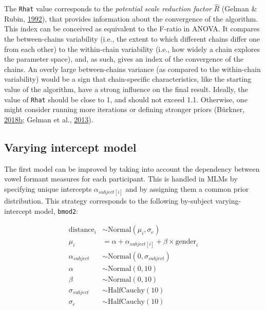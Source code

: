 \documentclass[a4paper,12pt,twoside,onecolumn,openright,final,oldfontcommands]{memoir}
\begin{document}
The \texttt{Rhat} value corresponds to the \emph{potential scale reduction factor} \(\hat{R}\) (Gelman \& Rubin, \protect\hyperlink{ref-gelman_inference_1992}{1992}), that provides information about the convergence of the algorithm. This index can be conceived as equivalent to the F-ratio in ANOVA. It compares the between-chains variability (i.e., the extent to which different chains differ one from each other) to the within-chain variability (i.e., how widely a chain explores the parameter space), and, as such, gives an index of the convergence of the chains. An overly large between-chains variance (as compared to the within-chain variability) would be a sign that chain-specific characteristics, like the starting value of the algorithm, have a strong influence on the final result. Ideally, the value of \texttt{Rhat} should be close to 1, and should not exceed 1.1. Otherwise, one might consider running more iterations or defining stronger priors (Bürkner, \protect\hyperlink{ref-R-brms}{2018}\protect\hyperlink{ref-R-brms}{b}; Gelman et al., \protect\hyperlink{ref-gelman_bayesian_2013}{2013}).

\hypertarget{shrink}{%
\subsection{Varying intercept model}\label{shrink}}

The first model can be improved by taking into account the dependency between vowel formant measures for each participant. This is handled in MLMs by specifying unique intercepts \(\alpha_{subject[i]}\) and by assigning them a common prior distribution. This strategy corresponds to the following by-subject varying-intercept model, \texttt{bmod2}:

\[
\begin{aligned}
\text{distance}_{i} &\sim \mathrm{Normal}(\mu_{i}, \sigma_{e}) \\
\mu_{i} &= \alpha + \alpha_{subject[i]} + \beta \times \text{gender}_{i} \\
\alpha_{subject} &\sim \mathrm{Normal}(0, \sigma_{subject}) \\
\alpha &\sim \mathrm{Normal}(0, 10) \\
\beta &\sim \mathrm{Normal}(0, 10) \\
\sigma_{subject} &\sim \mathrm{HalfCauchy}(10) \\
\sigma_{e} &\sim \mathrm{HalfCauchy}(10) \\
\end{aligned}
\]
\end{document}
